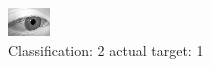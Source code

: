 \begin{figure}[h!]
\begin{center}
\includegraphics[width=0.60\columnwidth]{figures/ID2749_class_2_target_1.png}
\end{center}
\caption{ Classification: 2 actual target: 1}
\label{fig:ID2749_class_2_target_1}
\end{figure}
